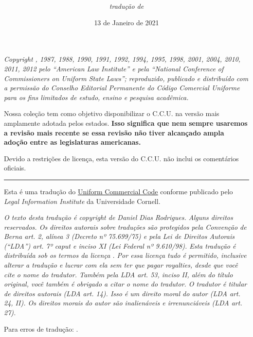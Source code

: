 \documentclass[a5paper,10pt]{book}
\title{\textbf{\titulo}}
\author{\textit{tradução de}\\\autor}
\date{13 de Janeiro de 2021}
\begin{document}
\maketitle

\textit{Copyright , 1987, 1988, 1990, 1991, 1992, 1994, 1995, 1998, 2001, 2004, 2010, 2011, 2012 pelo ``American Law Institute'' e pela ``National Conference of Commissioners on Uniform State Laws''; reproduzido, publicado e distribuído com a permissão do Conselho Editorial Permanente do Código Comercial Uniforme para os fins limitados de estudo, ensino e pesquisa acadêmica.}

Nossa coleção tem como objetivo disponibilizar o C.C.U. na versão mais amplamente adotada pelos estados. \textbf{Isso significa que nem sempre usaremos a revisão mais recente se essa revisão não tiver alcançado ampla adoção entre as legislaturas americanas.}

Devido a restrições de licença, esta versão do C.C.U. não inclui os comentários oficiais.

\begin{center}\rule{7cm}{0.4pt}\end{center}

Esta é uma tradução do \href{https://www.law.cornell.edu/ucc}{\underline{Uniform Commercial Code}} conforme publicado pelo \textit{Legal Information Institute} da Universidade Cornell.

\textit{O texto desta tradução é copyright  de Daniel Dias Rodrigues. Alguns direitos reservados. Os direitos autorais sobre traduções são protegidos pela Convenção de Berna art. 2, alínea 3 (Decreto nº 75.699/75) e pela Lei de Direitos Autorais (``LDA'') art. 7º caput e inciso XI (Lei Federal nº 9.610/98). Esta tradução é distribuída sob os termos da licença \href{https://creativecommons.org/licenses/by/4.0/deed.pt_BR}{\underline{}}. Por essa licença tudo é permitido, inclusive alterar a tradução e lucrar com ela sem ter que pagar royalties, desde que você cite o nome do tradutor. Também pela LDA art. 53, inciso II, além do título original, você também é obrigado a citar o nome do tradutor. O tradutor é titular de direitos autorais (LDA art. 14). Isso é um direito moral do autor (LDA art. 24, II). Os direitos morais do autor são inalienáveis e irrenunciáveis (LDA art. 27).}

Para erros de tradução: \href{mailto:danieldiasr@gmail.com}{\underline{}}.

\tableofcontents
\end{document}
